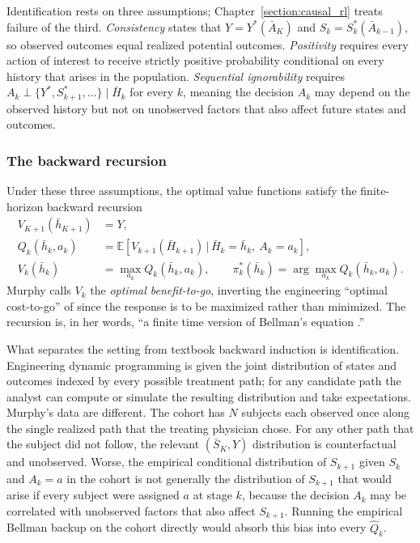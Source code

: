 Identification rests on three assumptions; Chapter~\ref{section:causal_rl} treats failure of the third. \emph{Consistency} states that $Y = Y^*(\bar A_K)$ and $S_k = S_k^*(\bar A_{k-1})$, so observed outcomes equal realized potential outcomes. \emph{Positivity} requires every action of interest to receive strictly positive probability conditional on every history that arises in the population. \emph{Sequential ignorability} requires $A_k \perp \{Y^*, S^*_{k+1}, \ldots\} \mid \bar H_k$ for every $k$, meaning the decision $A_k$ may depend on the observed history but not on unobserved factors that also affect future states and outcomes.

\subsubsection*{The backward recursion}

Under these three assumptions, the optimal value functions satisfy the finite-horizon backward recursion
\begin{align}
V_{K+1}(\bar h_{K+1}) &= Y, \label{eq:dtr_terminal}\\
Q_k(\bar h_k, a_k) &= \mathbb{E}\!\left[V_{k+1}(\bar H_{k+1}) \,\big|\, \bar H_k = \bar h_k,\ A_k = a_k\right], \label{eq:dtr_qfunc}\\
V_k(\bar h_k) &= \max_{a_k} Q_k(\bar h_k, a_k), \qquad \pi_k^*(\bar h_k) = \arg\max_{a_k} Q_k(\bar h_k, a_k). \label{eq:dtr_bellman}
\end{align}
Murphy calls $V_k$ the \emph{optimal benefit-to-go}, inverting the engineering ``optimal cost-to-go'' of \citet{bertsekas1996} since the response is to be maximized rather than minimized. The recursion is, in her words, ``a finite time version of Bellman's equation \citep{Bellman1957}.''

What separates the setting from textbook backward induction is identification. Engineering dynamic programming is given the joint distribution of states and outcomes indexed by every possible treatment path; for any candidate path the analyst can compute or simulate the resulting distribution and take expectations. Murphy's data are different. The cohort has $N$ subjects each observed once along the single realized path that the treating physician chose. For any other path that the subject did not follow, the relevant $(\bar S_K, Y)$ distribution is counterfactual and unobserved. Worse, the empirical conditional distribution of $S_{k+1}$ given $S_k$ and $A_k = a$ in the cohort is not generally the distribution of $S_{k+1}$ that would arise if every subject were assigned $a$ at stage $k$, because the decision $A_k$ may be correlated with unobserved factors that also affect $S_{k+1}$. Running the empirical Bellman backup on the cohort directly would absorb this bias into every $\hat Q_k$.

